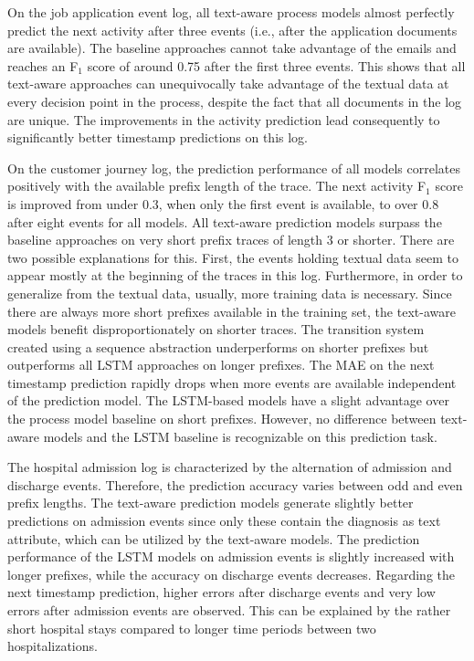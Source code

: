 On the job application event log, all text-aware process models almost perfectly predict the next activity after three events (i.e., after the application documents are available).
The baseline approaches cannot take advantage of the emails and reaches an F$_1$ score of around 0.75 after the first three events.
This shows that all text-aware approaches can unequivocally take advantage of the textual data at every decision point in the process, despite the fact that all documents in the log are unique.
The improvements in the activity prediction lead consequently to significantly better timestamp predictions on this log.

On the customer journey log, the prediction performance of all models correlates positively with the available prefix length of the trace.
The next activity F$_1$ score is improved from under 0.3, when only the first event is available, to over 0.8 after eight events for all models.
All text-aware prediction models surpass the baseline approaches on very short prefix traces of length 3 or shorter.
There are two possible explanations for this.
First, the events holding textual data seem to appear mostly at the beginning of the traces in this log.
Furthermore, in order to generalize from the textual data, usually, more training data is necessary.
Since there are always more short prefixes available in the training set, the text-aware models benefit disproportionately on shorter traces.
The transition system created using a sequence abstraction underperforms on shorter prefixes but outperforms all LSTM approaches on longer prefixes.
The MAE on the next timestamp prediction rapidly drops when more events are available independent of the prediction model.
The LSTM-based models have a slight advantage over the process model baseline on short prefixes.
However, no difference between text-aware models and the LSTM baseline is recognizable on this prediction task.

The hospital admission log is characterized by the alternation of admission and discharge events.
Therefore, the prediction accuracy varies between odd and even prefix lengths.
The text-aware prediction models generate slightly better predictions on admission events since only these contain the diagnosis as text attribute, which can be utilized by the text-aware models.
The prediction performance of the LSTM models on admission events is slightly increased with longer prefixes, while the accuracy on discharge events decreases.
Regarding the next timestamp prediction, higher errors after discharge events and very low errors after admission events are observed.
This can be explained by the rather short hospital stays compared to longer time periods between two hospitalizations.

